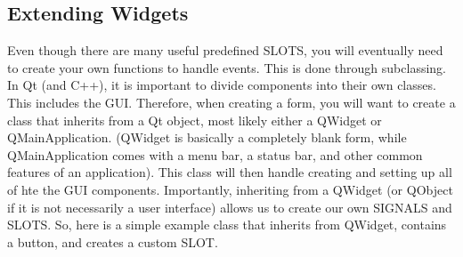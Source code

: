 \subsection{Extending Widgets}
Even though there are many useful predefined SLOTS, you will eventually need to create your own functions to handle events. This is done through subclassing. In Qt (and C++), it is important to divide components into their own classes. This includes the GUI. Therefore, when creating a form, you will want to create a class that inherits from a Qt object, most likely either a QWidget or QMainApplication. (QWidget is basically a completely blank form, while QMainApplication comes with a menu bar, a status bar, and other common features of an application). This class will then handle creating and setting up all of hte the GUI components. Importantly, inheriting from a QWidget (or QObject if it is not necessarily a user interface) allows us to create our own SIGNALS and SLOTS. So, here is a simple example class that inherits from QWidget, contains a button, and creates a custom SLOT.\\

